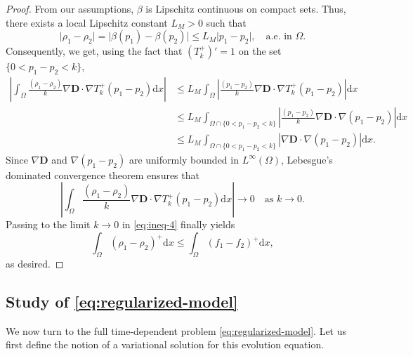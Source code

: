 \documentclass[final,reqno]{amsart}
\theoremstyle{plain}
\theoremstyle{definition}
\theoremstyle{remark}
\numberwithin{remark}{section}	%
\numberwithin{example}{section}	%
\newcommand{\de}{\mathbf{D}}
\newcommand{\Om}{\Omega}
\newcommand{\dd}{\mathrm{d}}
\begin{document}
\begin{proof}
From our assumptions, $\beta$ is Lipschitz continuous on compact sets. Thus, there exists a local Lipschitz constant $L_M > 0$ such that
    \[
        \vert \rho_1 - \rho_2\vert = \vert \beta(p_1) - \beta(p_2)\vert \leq L_M \vert p_1 - p_2\vert, \quad \text{a.e. in } \Omega.
    \]
Consequently, we get, using the fact that $(T_k^+)' = 1$ on the set $\{0 < p_1 - p_2 < k\}$,
    \begin{equation}
        \begin{aligned}
            \left\vert \int_{\Omega} \frac{(\rho_1 - \rho_2)}{k}\nabla\de\cdot\nabla T_{k}^{+}(p_1-p_2)\dd x \right\vert &\leq L_M \int_{\Omega} \left\vert \frac{(p_1 - p_2)}{k}\nabla\de\cdot\nabla T_{k}^{+}(p_1-p_2)\right\vert \dd x\\
            &\leq L_M \int_{\Omega\cap\{0 < p_1-p_2 < k\}} \left\vert \frac{(p_1 - p_2)}{k} \nabla\de\cdot\nabla (p_1-p_2)\right\vert \dd x\\
            &\leq L_M \int_{\Omega\cap\{0 < p_1-p_2 < k\}} \left\vert\nabla\de\cdot\nabla (p_1-p_2)\right\vert \dd x.
        \end{aligned}
    \end{equation}
   Since $\nabla \de$ and $\nabla(p_1-p_2)$ are uniformly bounded in $L^\infty(\Omega)$, Lebesgue's dominated convergence theorem ensures that
    \[
        \left\vert \int_{\Omega} \frac{(\rho_1 - \rho_2)}{k}\nabla\de\cdot\nabla T_{k}^{+}(p_1-p_2)\dd x\right\vert \longrightarrow 0 \quad \text{as } k\to 0.
    \]
    Passing to the limit $k \to 0$ in \eqref{eq:ineq-4} finally yields
    \[
        \int_{\Om}(\rho_1-\rho_2)^{+}\dd x \leq \int_{\Om} (f_1-f_2)^{+}\dd x,
    \]
as desired.
\end{proof}
\subsection{Study of \eqref{eq:regularized-model}}

We now turn to the full time-dependent problem \eqref{eq:regularized-model}. Let us first define the notion of a variational solution for this evolution equation.
\end{document}
